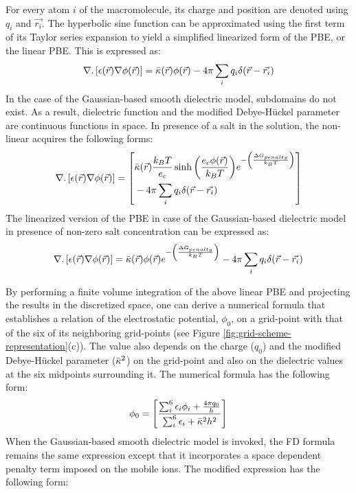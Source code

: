 \documentclass[9pt,tutorial,pubversion]{livecoms}
\begin{document}
For every atom $ i $ of the macromolecule, its charge and position are denoted using $ q_i $ and $ \Vec{r_i}$. The hyperbolic sine function can be approximated using the first term of its Taylor series expansion to yield a simplified linearized form of the PBE, or the linear PBE. This is expressed as:
\begin{equation}
\nabla . \left[ \epsilon(\Vec{r})\nabla\phi(\Vec{r})\right] = \Bar{\kappa}(\Vec{r})\phi(\Vec{r}) - 4\pi\sum_{i} {q_i \delta(\Vec{r} - \Vec{r_i})}
\end{equation}
In the case of the Gaussian-based smooth dielectric model, subdomains do not exist. As a result,  dielectric function and the modified Debye-Hückel parameter are continuous functions in space. In presence of a salt in the solution, the non-linear acquires the following forms:
\begin{equation}
\nabla.\left[\epsilon(\Vec{r})\nabla\phi(\Vec{r})\right] = \left[
    \begin{aligned}
    & \Bar{\kappa}(\Vec{r})\frac{k_BT}{e_c}\sinh{\left(\frac{e_c\phi(\Vec{r})}{k_BT}\right)}e^{-\left(\frac{\Delta G_{penalty}}{k_BT} \right)} \\
    &- 4\pi\sum_{i} {q_i \delta(\Vec{r} - \Vec{r_i})}
\end{aligned}
\right]
\end{equation}
The linearized version of the PBE in case of the Gaussian-based dielectric model in presence of non-zero salt concentration can be expressed as:
\begin{equation}
\nabla . \left[ \epsilon(\Vec{r})\nabla\phi(\Vec{r})\right] = \Bar{\kappa}(\Vec{r})\phi(\Vec{r})e^{-\left(\frac{\Delta G_{penalty}}{k_BT} \right)} - 4\pi\sum_{i} {q_i \delta(\Vec{r} - \Vec{r_i})}
\end{equation}

By performing a finite volume integration of the above linear PBE and projecting the results in the discretized space, one can derive a numerical formula that establishes a relation of the electrostatic potential, $ \phi_0 $, on a grid-point with that of the six of its neighboring grid-points (see Figure \ref{fig:grid-scheme-representation}(c)). The value also depends on the charge ($ q_0 $) and the modified Debye-Hückel parameter ($ \Bar{\kappa}^2 $) on the grid-point and also on the dielectric values at the six midpoints surrounding it. The numerical formula has the following form:
\begin{equation}
    \phi_0 = 
    \left[ 
        \frac{\sum_i^6{\epsilon_i\phi_i } + 
                \frac{4\pi q_0}{h}
             }
             {\sum_i^6{\epsilon_i} + \Bar{\kappa}^2h^2}
    \right]
\end{equation}
When the Gaussian-based smooth dielectric model is invoked, the FD formula remains the same expression except that it incorporates a space dependent penalty term imposed on the mobile ions. The modified expression has the following form:
\end{document}
